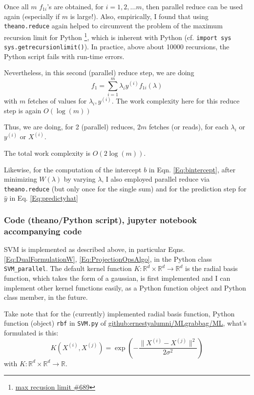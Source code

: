 \documentclass[10pt]{amsart}
\begin{document}
\begin{multicols*}{2}
Once all $m$ $f_{1i}$'s are obtained, for $i=1,2,\dots m$, then parallel reduce can be used again (especially if $m$ is large!).  Also, empirically, I found that using \verb|theano.reduce| again helped to circumvent the problem of the maximum recursion limit for Python \footnote{\href{https://github.com/Theano/Theano/issues/689}{max recusion limit \#689}}, which is inherent with Python (cf. \verb|import sys  sys.getrecursionlimit()|).  In practice, above about 10000 recursions, the Python script fails with run-time errors.

Nevertheless, in this second (parallel) reduce step, we are doing
\[
f_1 = \sum_{i=1}^m \lambda_i y^{(i)} f_{1i}(\lambda)
\]
with $m$ fetches of values for $\lambda_i, y^{(i)}$.  The work complexity here for this reduce step is again $O(\log(m))$

Thus, we are doing, for 2 (parallel) reduces, $2m$ fetches (or reads), for each $\lambda_i$ or $y^{(i)}$ or $X^{(i)}$.

The total work complexity is $O(2\log(m))$.  

Likewise, for the computation of the intercept $b$ in Eqn. \ref{Eq:bintercept}, after minimizing $W(\lambda)$ by varying $\lambda$, I also employed parallel reduce via \verb|theano.reduce| (but only once for the single sum) and for the prediction step for $\widehat{y}$ in Eq. \ref{Eq:predictyhat}

\subsubsection{Code (theano/Python script), jupyter notebook accompanying code}\label{SubSec:Code}

SVM is implemented as described above, in particular Eqns. \ref{Eq:DualFormulationW}, \ref{Eq:ProjectionOpsAlgo}, in the Python class \verb|SVM_parallel|.  The default kernel function $K:\mathbb{R}^d\times \mathbb{R}^d \to \mathbb{R}^d$ is the radial basis function, which takes the form of a gaussian, is first implemented and I can implement other kernel functions easily, as a Python function object and Python class member, in the future.

Take note that for the (currently) implemented radial basis function, Python function (object) \verb|rbf| in \verb|SVM.py| of \href{https://github.com/ernestyalumni/MLgrabbag/blob/master/ML/SVM.py}{github:ernestyalumni/MLgrabbag/ML}, what's formulated is this:
\begin{equation}\label{Eq:rbf}
K(X^{(i)}, X^{(j)}) = \exp{ \left( - \frac{ \| X^{(i)} - X^{(j)} \|^2}{ 2\sigma^2 }  \right) } 
\end{equation}
with $K: \mathbb{R}^d \times \mathbb{R}^d \to \mathbb{R}$.


\end{multicols*}
\end{document}
